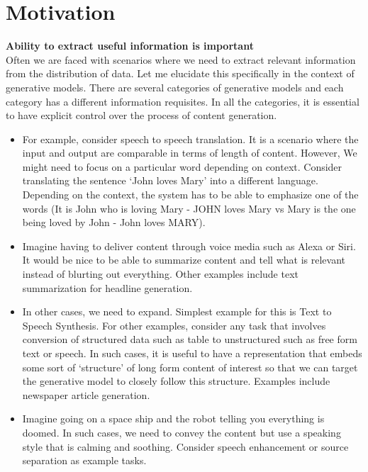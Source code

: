 \section{Motivation}

\textbf{Ability to extract useful information is important} \\

Often we are faced with scenarios where we need to extract relevant information from the distribution of data. Let me elucidate this specifically in the context of generative models. There are several categories of generative models and each category has a different information requisites. In all the categories, it is essential to have explicit control over the process of content generation. 

\begin{itemize}
    \item For example, consider speech to speech translation. It is a scenario where the input and output are comparable in terms of length of content. However, We might need to focus on a particular word depending on context. Consider translating the sentence `John loves Mary' into a different language. Depending on the context, the system has to be able to emphasize one of the words (It is John who is loving Mary - JOHN loves Mary vs Mary is the one being loved by John - John loves MARY).
    
    \item Imagine having to deliver content through voice media such as Alexa or Siri. It would be nice to be able to summarize content and tell what is relevant instead of blurting out everything. Other examples include text summarization for headline generation. 
    
    \item In other cases, we need to expand. Simplest example for this is Text to Speech Synthesis. For other examples, consider any task that involves conversion of structured data such as table to unstructured such as free form text or speech. In such cases, it is useful to have a representation that embeds some sort of `structure' of long form content of interest so that we can target the generative model to closely follow this structure. Examples include newspaper article generation. 
    
    \item   Imagine going on a space ship and the robot telling you everything is doomed. In such cases, we need to convey the content but use a speaking style that is calming and soothing. Consider speech enhancement or source separation as example tasks.

\end{itemize} 

